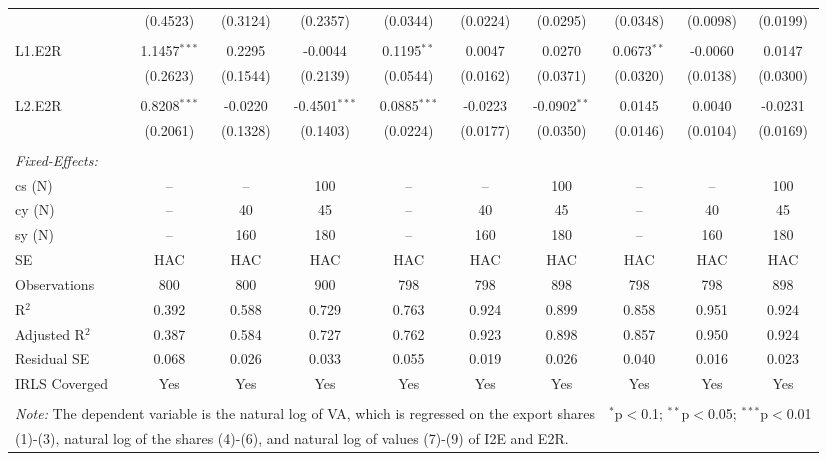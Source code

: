 \documentclass[a4paper]{article}
\begin{document}
\begin{table}[!htbp]
{\begin{tabular}[t]{lccccccccc}
  & (0.4523) & (0.3124) & (0.2357) & (0.0344) & (0.0224) & (0.0295) & (0.0348) & (0.0098) & (0.0199) \\ 
  & & & & & & & & & \\ 
 L1.E2R & 1.1457$^{***}$ & 0.2295 & -0.0044 & 0.1195$^{**}$ & 0.0047 & 0.0270 & 0.0673$^{**}$ & -0.0060 & 0.0147 \\ 
  & (0.2623) & (0.1544) & (0.2139) & (0.0544) & (0.0162) & (0.0371) & (0.0320) & (0.0138) & (0.0300) \\ 
  & & & & & & & & & \\ 
 L2.E2R & 0.8208$^{***}$ & -0.0220 & -0.4501$^{***}$ & 0.0885$^{***}$ & -0.0223 & -0.0902$^{**}$ & 0.0145 & 0.0040 & -0.0231 \\ 
  & (0.2061) & (0.1328) & (0.1403) & (0.0224) & (0.0177) & (0.0350) & (0.0146) & (0.0104) & (0.0169) \\ 
  & & & & & & & & & \\ 
\midrule \emph{Fixed-Effects:} &   &   &   &   &   &  \\
cs (N) & -- & -- & 100 & -- & -- & 100 & -- & -- & 100\\
cy (N) & -- & 40 & 45 & -- & 40 & 45 & -- & 40 & 45\\
sy (N) & -- & 160 & 180 & -- & 160 & 180 & -- & 160 & 180\\
\midrule
SE & HAC & HAC & HAC &HAC &HAC &HAC &HAC &HAC &HAC \\
Observations & 800 & 800 & 900 & 798 & 798 & 898 & 798 & 798 & 898 \\ 
R$^{2}$ & 0.392 & 0.588 & 0.729 & 0.763 & 0.924 & 0.899 & 0.858 & 0.951 & 0.924 \\ 
Adjusted R$^{2}$ & 0.387 & 0.584 & 0.727 & 0.762 & 0.923 & 0.898 & 0.857 & 0.950 & 0.924 \\ 
Residual SE & 0.068 & 0.026 & 0.033 & 0.055 & 0.019 & 0.026 & 0.040 & 0.016 & 0.023 \\ 
IRLS Coverged & Yes & Yes & Yes & Yes & Yes & Yes & Yes & Yes & Yes \\ \bottomrule \\[-1em]
\multicolumn{7}{l}{\small \textit{Note:} The dependent variable is the natural log of VA, which is regressed on the  export shares}   & \multicolumn{3}{r}{$^{*}$p$<$0.1; $^{**}$p$<$0.05; $^{***}$p$<$0.01} \\ [-0.2em]
\multicolumn{10}{l}{\small \quad \quad \quad (1)-(3), natural log of the shares (4)-(6), and natural log of values (7)-(9) of I2E and E2R.} \\
\end{tabular} 
}
\end{table} 
\FloatBarrier
\end{document}
